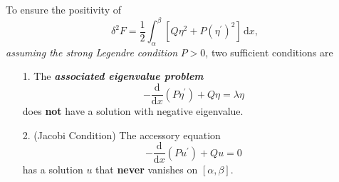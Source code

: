 \documentclass{article}
\theoremstyle{nonumberplain}
\begin{document}
\begin{frm-res}
    To ensure the positivity of 
    \[
        \delta ^{2} F = \frac{1}{2}\int_{\alpha }^{\beta } \left[ Q \eta ^{2}  + P (\eta ^\prime )^{2} \right] \,\mathrm{d}x,
    \]
    \textit{assuming the strong Legendre condition} $P>0$, two sufficient conditions are 
    \begin{itemize}
        \item[1.] The \textit{\textbf{associated eigenvalue problem}} 
        \[
            - \frac{\mathrm{d}}{\mathrm{d}x} \left(P \eta ^\prime \right) +Q \eta  
            = \lambda \eta 
        \] 
        does \textbf{not} have a solution with negative eigenvalue. 
        \item[2.] (Jacobi Condition)
        The accessory equation
        \[
            - \frac{\mathrm{d}}{\mathrm{d}x} \left(P u^\prime \right) + Q u =0
        \]
        has a solution $u$ that \textbf{never} vanishes on $[\alpha ,\beta ]$. 
    \end{itemize}
\end{frm-res}
\end{document}
